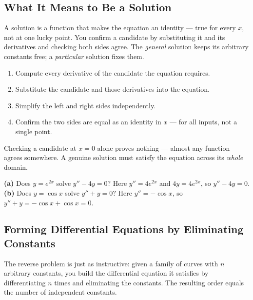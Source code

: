 \subsection{What It Means to Be a Solution}

A solution is a function that makes the equation an identity --- true for every
$x$, not at one lucky point. You confirm a candidate by substituting it and its
derivatives and checking both sides agree. The \emph{general} solution keeps its
arbitrary constants free; a \emph{particular} solution fixes them.

\begin{methodbox}
\begin{enumerate}[leftmargin=1.6em, itemsep=2pt]
    \item Compute every derivative of the candidate the equation requires.
    \item Substitute the candidate and those derivatives into the equation.
    \item Simplify the left and right sides independently.
    \item Confirm the two sides are equal as an identity in $x$ --- for all
          inputs, not a single point.
\end{enumerate}
\end{methodbox}

\begin{warningbox}
Checking a candidate at $x = 0$ alone proves nothing --- almost any function
agrees somewhere. A genuine solution must satisfy the equation across its
\emph{whole} domain.
\end{warningbox}

\begin{examplebox}
\textbf{(a)} Does $y = e^{2x}$ solve $y'' - 4y = 0$? Here $y'' = 4e^{2x}$ and
$4y = 4e^{2x}$, so $y'' - 4y = 0$. \checkmark\\
\textbf{(b)} Does $y = \cos x$ solve $y'' + y = 0$? Here $y'' = -\cos x$, so
$y'' + y = -\cos x + \cos x = 0$. \checkmark
\end{examplebox}

\subsection{Forming Differential Equations by Eliminating Constants}

The reverse problem is just as instructive: given a family of curves with $n$
arbitrary constants, you build the differential equation it satisfies by
differentiating $n$ times and eliminating the constants. The resulting order
equals the number of independent constants.

